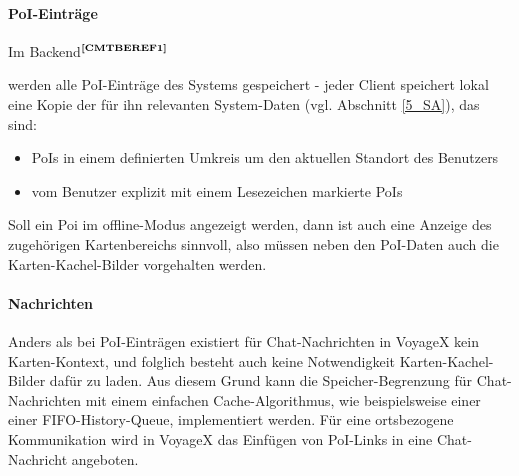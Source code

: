 \paragraph{PoI-Einträge}
Im Backend$^{\textbf{\ref{CMTBEREF1}}}$%
\addtocounter{footnote}{1}%
 werden alle PoI-Einträge des Systems gespeichert - jeder Client speichert lokal eine Kopie der für ihn relevanten System-Daten (vgl. Abschnitt \ref{5_SA}), das sind:
	\begin{itemize}
		\item PoIs in einem definierten Umkreis um den aktuellen Standort des Benutzers
		\item vom Benutzer explizit mit einem Lesezeichen markierte PoIs
	\end{itemize}
Soll ein Poi im offline-Modus angezeigt werden, dann ist auch eine Anzeige des zugehörigen Kartenbereichs sinnvoll, also müssen neben den PoI-Daten auch die Karten-Kachel-Bilder vorgehalten werden.

\paragraph{Nachrichten}
Anders als bei PoI-Einträgen existiert für Chat-Nachrichten in VoyageX kein Karten-Kontext, und folglich besteht auch keine Notwendigkeit Karten-Kachel-Bilder dafür zu laden. Aus diesem Grund kann die Speicher-Begrenzung für
Chat-Nachrichten mit einem einfachen Cache-Algorithmus, wie beispielsweise einer einer FIFO-History-Queue, implementiert werden. Für eine ortsbezogene Kommunikation wird in VoyageX das Einfügen von PoI-Links in eine Chat-Nachricht angeboten.

